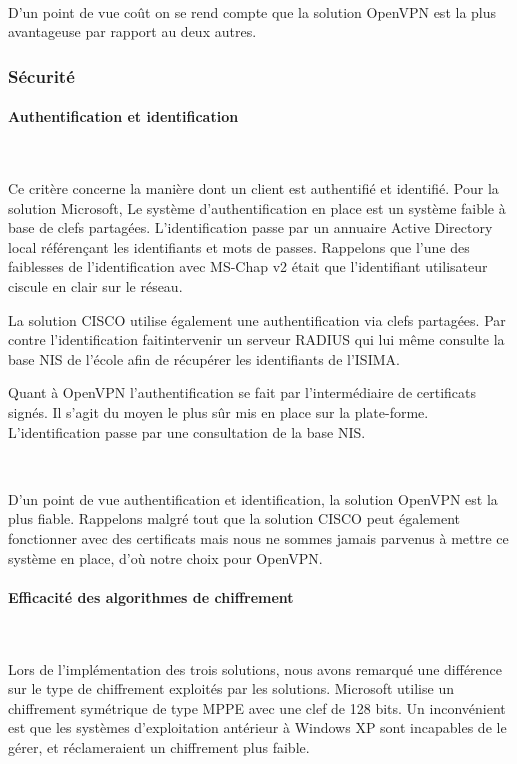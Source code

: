 ~

D'un point de vue coût on se rend compte que la solution OpenVPN est la plus avantageuse par rapport au deux autres.

\subsubsection{Sécurité}

\paragraph{Authentification et identification}
~

Ce critère concerne la manière dont un client est authentifié et identifié. Pour la solution Microsoft, Le système d'authentification en place est un système faible à base de clefs partagées. L'identification passe par un annuaire Active Directory local référençant les identifiants et mots de passes. Rappelons que l'une des faiblesses de l'identification avec MS-Chap v2 était que l'identifiant utilisateur ciscule en clair sur le réseau.

La solution CISCO utilise également une authentification via clefs partagées. Par contre l'identification faitintervenir un serveur RADIUS qui lui même consulte la base NIS de l'école afin de récupérer les identifiants de l'ISIMA.

Quant à OpenVPN l'authentification se fait par l'intermédiaire de certificats signés. Il s'agit du moyen le plus sûr mis en place sur la plate-forme. L'identification passe par une consultation de la base NIS.

~

D'un point de vue authentification et identification, la solution OpenVPN est la plus fiable. Rappelons malgré tout que la solution CISCO peut également fonctionner avec des certificats mais nous ne sommes jamais parvenus à mettre ce système en place, d'où notre choix pour OpenVPN.

\paragraph{Efficacité des algorithmes de chiffrement}
~

Lors de l'implémentation des trois solutions, nous avons remarqué une différence sur le type de chiffrement exploités par les solutions. Microsoft utilise un chiffrement symétrique de type MPPE avec une clef de 128 bits. Un inconvénient est que les systèmes d'exploitation antérieur à Windows XP sont incapables de le gérer, et réclameraient un chiffrement plus faible.

